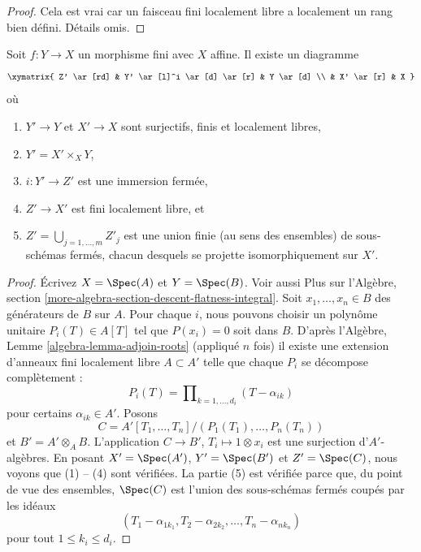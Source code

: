 \begin{proof}
Cela est vrai car un faisceau fini localement libre a localement
un rang bien défini. Détails omis.
\end{proof}

\begin{lemma}
\label{lemma-massage-finite}
Soit $f : Y \to X$ un morphisme fini avec $X$ affine.
Il existe un diagramme
$$
\xymatrix{
Z' \ar[rd] &
Y' \ar[l]^i \ar[d] \ar[r] &
Y \ar[d] \\
 & X' \ar[r] & X
}
$$
où
\begin{enumerate}
\item $Y' \to Y$ et $X' \to X$ sont surjectifs, finis et localement libres,
\item $Y' = X' \times_X Y$,
\item $i : Y' \to Z'$ est une immersion fermée,
\item $Z' \to X'$ est fini localement libre, et
\item $Z' = \bigcup_{j = 1, \ldots, m} Z'_j$ est une union finie (au sens des ensembles) de sous-schémas
fermés, chacun desquels se projette isomorphiquement sur
$X'$.
\end{enumerate}
\end{lemma}

\begin{proof}
Écrivez $X = \Spec(A)$ et $Y = \Spec(B)$. Voir aussi Plus
sur l'Algèbre, section \ref{more-algebra-section-descent-flatness-integral}. Soit $x_1, \ldots, x_n \in B$ des générateurs de $B$
sur $A$. Pour chaque $i$, nous pouvons choisir
un polynôme unitaire $P_i(T) \in A[T]$ tel que $P(x_i) = 0$ soit dans
$B$. D'après l'Algèbre,
Lemme \ref{algebra-lemma-adjoin-roots} (appliqué $n$ fois) il
existe une extension d'anneaux fini localement libre $A \subset A'$
telle que chaque $P_i$ se décompose complètement :
$$
P_i(T) = \prod\nolimits_{k = 1, \ldots, d_i} (T - \alpha_{ik})
$$
pour certains $\alpha_{ik} \in A'$. Posons
$$
C = A'[T_1, \ldots, T_n]/(P_1(T_1), \ldots, P_n(T_n))
$$
et $B' = A' \otimes_A B$. L'application $C \to B'$, $T_i \mapsto 1 \otimes x_i$ est une surjection d'$A'$-algèbres.
En posant $X' = \Spec(A')$, $Y' = \Spec(B')$ et $Z' = \Spec(C)$,
nous voyons que (1) -- (4) sont vérifiées. La partie
(5) est vérifiée parce que, du point de vue des ensembles,
$\Spec(C)$ est l'union des sous-schémas fermés
coupés par les idéaux
$$
(T_1 - \alpha_{1k_1}, T_2 - \alpha_{2k_2}, \ldots, T_n - \alpha_{nk_n})
$$
pour tout $1 \leq k_i \leq d_i$.
\end{proof}

